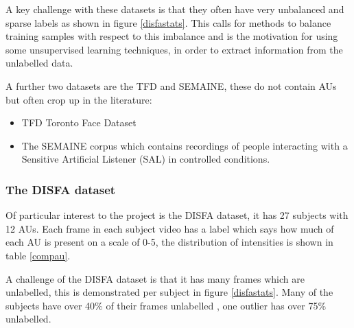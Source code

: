 \documentclass[9pt]{article} \usepackage{amsmath, amsthm, amssymb}
\begin{document}
A key challenge with these datasets is that they often have very unbalanced and
sparse labels as shown in figure \ref{disfastats}. This calls for methods
to balance training samples with respect to this imbalance and is the
motivation for using some unsupervised learning techniques, in order to extract information
from the unlabelled data.

A further two datasets are the TFD and SEMAINE, these do not contain AUs but often crop up in the
literature:
\begin{itemize}
     \item TFD \cite{tfd} Toronto Face Dataset
     \item The SEMAINE \cite{semaine} corpus which contains recordings
           of people interacting with a Sensitive Artificial Listener (SAL) in controlled conditions.
\end{itemize}

\subsubsection{The DISFA dataset} \label{disfa_list}
Of particular interest to the project is the DISFA dataset, it has 27 subjects with 12 AUs.
Each frame in each subject video has a label which says how much of each AU is present on
a scale of 0-5, the distribution of intensities is shown in table \ref{compau}.

A challenge of the DISFA dataset is that it has many frames which are unlabelled, this is demonstrated
per subject in figure \ref{disfastats}. Many of the subjects have over 40\% of their frames unlabelled
, one outlier has over 75\% unlabelled.
\end{document}
